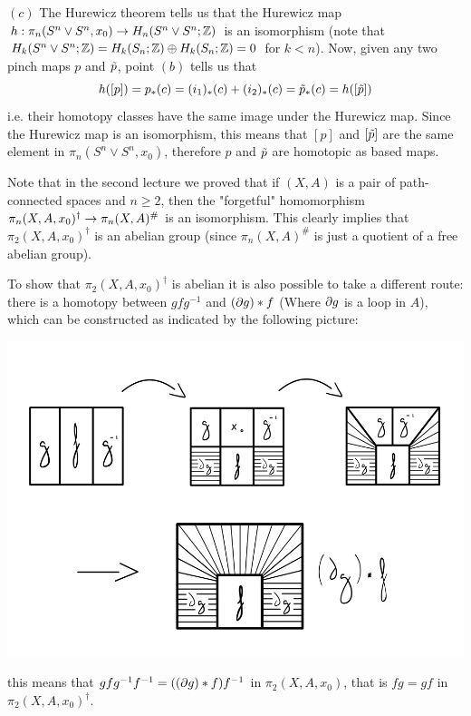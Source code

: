 \documentclass[a4paper,11pt,english]{article}
\begin{document}
\begin{exercise}[2]
$(c)$ The Hurewicz theorem tells us that the Hurewicz map $h:\pi_n(S^n\vee S^n,x_0)\to H_n(S^n\vee S^n;\mathbb{Z})$ is an isomorphism (note that $H_k(S^n\vee S^n;\mathbb{Z})=H_k(S_n;\mathbb{Z})\oplus H_k(S_n;\mathbb{Z})=0$ for $k<n$). Now, given any two pinch maps $p$ and $\tilde{p}$, point $(b)$ tells us that \[h([p])=p_*(c)=(i_1)_*(c)+(i_2)_*(c)=\tilde{p}_*(c)=h([\tilde{p}])\]
i.e. their homotopy classes have the same image under the Hurewicz map. Since the Hurewicz map is an isomorphism, this means that $[p]$ and $[\tilde{p}]$ are the same element in $\pi_n(S^n\vee S^n,x_0)$, therefore $p$ and $\tilde{p}$ are homotopic as based maps.

\end{exercise}



\begin{exercise}[3]

Note that in the second lecture we proved that if $(X,A)$ is a pair of path-connected spaces and $n\geq2$, then the "forgetful" homomorphism $\pi_n(X,A,x_0)^\dagger\to\pi_n(X,A)^\#$ is an isomorphism. This clearly implies that $\pi_2(X,A,x_0)^\dagger$ is an abelian group (since $\pi_n(X,A)^\#$ is just a quotient of a free abelian group).

To show that $\pi_2(X,A,x_0)^\dagger$ is abelian it is also possible to take a different route: there is a homotopy between $gfg^{-1}$ and $(\partial g)*f$ (Where $\partial g$ is a loop in $A$), which can be constructed as indicated by the following picture:\vspace{-0.3cm}
\begin{center}
    \includegraphics[scale=0.38]{Some_homotopy.jpg}
\end{center}
this means that $gfg^{-1}f^{-1}=((\partial g)*f)f^{-1}$ in $\pi_2(X,A,x_0)$, that is $fg=gf$ in $\pi_2(X,A,x_0)^\dagger$.

\end{exercise}
\end{document}
